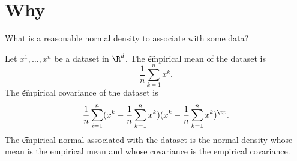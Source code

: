 

\section*{Why}

What is a reasonable normal density to associate with some data?


Let $x^1, \dots , x^n$ be a dataset in $\R ^d$.
The \t{empirical mean} of the dataset is
\[
\frac{1}{n} \sum_{k = 1}^{n} x^k.
\]
The \t{empirical covariance} of the dataset is
\[
\frac{1}{n} \sum_{i = 1}^{n} (x^k - \frac{1}{n} \sum_{k = 1}^{n} x^k) (x^k - \frac{1}{n} \sum_{k = 1}^{n} x^k)^{\tp}.
\]
The \t{empirical normal} associated with the dataset is the normal density whose mean is the empirical mean and whose covariance is the empirical covariance.
